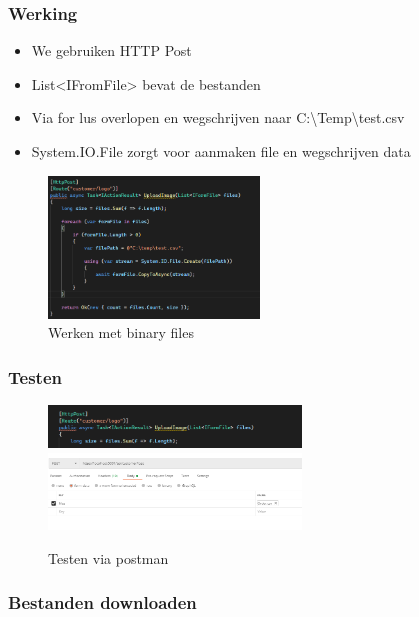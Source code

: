 \documentclass{article}
\begin{document}
\subsubsection{Werking}

\begin{itemize}
    \item We gebruiken HTTP Post
    \item List<IFromFile> bevat de bestanden
    \item Via for lus overlopen en wegschrijven naar C:\textbackslash Temp\textbackslash test.csv
    \item System.IO.File zorgt voor aanmaken file en wegschrijven data
\end{itemize}

\begin{figure}[H]
    \centering
    \includegraphics[width=0.5\textwidth]{binary-files.png}
    \caption{Werken met binary files}
\end{figure}

\subsubsection{Testen}

\begin{figure}[H]
    \centering
    \includegraphics[width=0.6\textwidth]{binary-files-testing.png}
    \includegraphics[width=0.6\textwidth]{binary-files-testing2.png}
    \caption{Testen via postman}
\end{figure}

\subsubsection{Bestanden downloaden}
\end{document}
